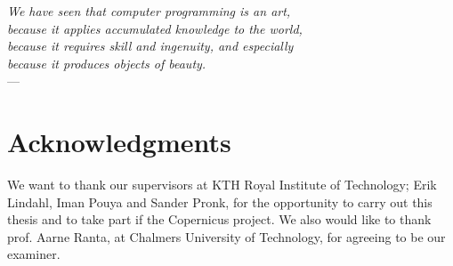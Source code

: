 
\begin{flushright}{\slshape    
    We have seen that computer programming is an art, \\ 
    because it applies accumulated knowledge to the world, \\ 
    because it requires skill and ingenuity, and especially \\
    because it produces objects of beauty.} \\ \medskip
    ---  \citep{knuth:1974}
\end{flushright}



\bigskip

\begingroup
\let\clearpage\relax
\let\cleardoublepage\relax
\let\cleardoublepage\relax
\chapter*{Acknowledgments}
We want to thank our supervisors at KTH Royal Institute of Technology;
Erik Lindahl, Iman Pouya and Sander Pronk, for the opportunity to
carry out this thesis and to take part if the Copernicus project. We
also would like to thank prof. Aarne Ranta, at Chalmers University of
Technology, for agreeing to be our examiner.

\endgroup



